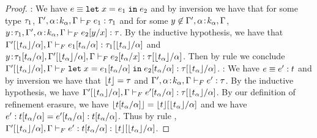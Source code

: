 \begin{proof}
\pfcase{\fLet}: We have $\sexpr \equiv \eletin{x}{\sexpr_1}{\sexpr_2}$
and by inversion we have that for some type $\sftype_1$,
$\hasftype{\tcenv', \bind{\al}{k_{\al}}, \tcenv}{\sexpr_1}{\sftype_1}$
and for some $\notmem{y}{\tcenv', \bind{\al}{k_{\al}}, \tcenv}$,
$\hasftype{\bind{y}{\sftype_1},\tcenv', \bind{\al}{k_{\al}}, \tcenv}
{\subst{\sexpr_2}{x}{y}}{\sftype}$.
By the inductive hypothesis, we have that
$\hasftype{\subst{\tcenv'}{\al}{\forgetreft{\stype_{\al}}}, \tcenv}
{\subst{\sexpr_1}{\tvar}{\stype_\tvar}}{\subst{\sftype_1}{\tvar}{\forgetreft{\stype_\tvar}}}$
and
$\hasftype{\bind{y}{\subst{\sftype_1}{\tvar}{\stype_\tvar}},\subst{\tcenv'}{\al}{\forgetreft{\stype_{\al}}}, \tcenv}
{\subst{\sexpr_2}{x}{\stype_\tvar}}{\subst{\sftype}{\tvar}{\forgetreft{\stype_\tvar}}}$.
Then by rule \fLet we conclude
$\hasftype{\subst{\tcenv'}{\al}{\forgetreft{\stype_{\al}}}, \tcenv}
{\eletin{x}{\subst{\sexpr_1}{\tvar}{\stype_\tvar}}{\subst{\sexpr_2}{\tvar}{\stype_\tvar}}}{\subst{\sftype}{\tvar}{\forgetreft{\stype_\tvar}}}$.
\pfcase{\fAnn}: We have $\sexpr \equiv \tyann{\sexpr'}{\stype}$ 
and by inversion we have that $\forgetreft{\stype} = \sftype$ and 
$\hasftype{\tcenv', \bind{\al}{k_{\al}}, \tcenv}
{\sexpr'}{\sftype}$.
By the inductive hypothesis, we have
$\hasftype{\subst{\tcenv'}{\al}{\forgetreft{\stype_{\al}}}, \tcenv}
{\subst{\sexpr'}{\tvar}{\stype_\tvar}}{\subst{\sftype}{\tvar}{\forgetreft{\stype_\tvar}}}$.
By our definition of refinement erasure, we have
$\forgetreft{\subst{\stype}{\tvar}{\stype_\tvar}}
 = \subst{\forgetreft{\stype}}{\tvar}{\forgetreft{\stype_\tvar}}$
and we have 
$\subst{\tyann{\sexpr'}{\stype}}{\tvar}{\stype_\tvar} 
 = \tyann{\subst{\sexpr'}{\tvar}{\stype_\tvar}}{\subst{\stype}{\tvar}{\stype_\tvar}}$. Thus by rule \fAnn,
$\hasftype{\subst{\tcenv'}{\al}{\forgetreft{\stype_{\al}}}, \tcenv}
{\subst{\tyann{\sexpr'}{\stype}}{\tvar}{\stype_\tvar}}{\subst{\forgetreft{\stype}}{\tvar}{\forgetreft{\stype_\tvar}}}$.
\end{proof}
